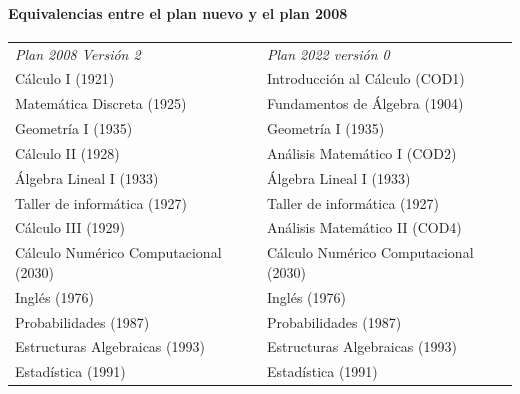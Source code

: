 \documentclass[a4paper, 12pt]{article}
\begin{document}
\paragraph{Equivalencias entre el plan nuevo y el plan 2008} \fontsize{11pt}{11pt}\selectfont
\begin{center}
\begin{tabularx}{1\textwidth}{|>{\raggedright\arraybackslash}X |
>{\raggedright\arraybackslash}X |}
\hline
  \rowcolor[gray]{.9}
  \multicolumn{2}{|c|}{\textbf{Equivalencias}}\\\hline

   \emph{Plan 2008 Versión 2 }  &  \emph{
Plan 2022 versión 0}   \\
\hline


Cálculo I       (1921)               &Introducción al Cálculo    (COD1)      \\   \hline

Matemática Discreta   (1925)          &Fundamentos de Álgebra (1904) \\ \hline

Geometría I        (1935)             & Geometría I (1935)   \\ \hline

Cálculo II         (1928)             & Análisis Matemático I (COD2)  \\ \hline

Álgebra Lineal I      (1933)          & Álgebra Lineal I  (1933)  \\ \hline

Taller de informática  (1927)        &Taller de informática (1927) \\ \hline

Cálculo III        (1929)             & Análisis Matemático II (COD4)  \\ \hline

Cálculo Numérico  Computacional (2030) &Cálculo Numérico Computacional (2030) 
\\ \hline

Inglés       (1976)            &    Inglés (1976) 
\\ \hline

Probabilidades  (1987)      &Probabilidades    (1987)      \\ \hline

Estructuras Algebraicas (1993)    & Estructuras Algebraicas (1993)  \\ \hline

Estadística     (1991)    &Estadística     (1991)        \\ \hline



\end{tabularx}
\end{center}
\end{document}
